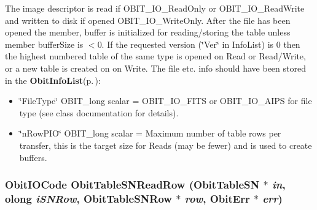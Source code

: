 The image descriptor is read if OBIT\_\-IO\_\-Read\-Only or OBIT\_\-IO\_\-Read\-Write and written to disk if opened OBIT\_\-IO\_\-Write\-Only. After the file has been opened the member, buffer is initialized for reading/storing the table unless member buffer\-Size is $<$0. If the requested version (\char`\"{}Ver\char`\"{} in Info\-List) is 0 then the highest numbered table of the same type is opened on Read or Read/Write, or a new table is created on on Write. The file etc. info should have been stored in the {\bf Obit\-Info\-List}{\rm (p.\,\pageref{structObitInfoList})}: \begin{itemize}
\item \char`\"{}File\-Type\char`\"{} OBIT\_\-long scalar = OBIT\_\-IO\_\-FITS or OBIT\_\-IO\_\-AIPS for file type (see class documentation for details). \item \char`\"{}n\-Row\-PIO\char`\"{} OBIT\_\-long scalar = Maximum number of table rows per transfer, this is the target size for Reads (may be fewer) and is used to create buffers. 
\end{itemize}
\subsubsection{\setlength{\rightskip}{0pt plus 5cm}Obit\-IOCode Obit\-Table\-SNRead\-Row ({\bf Obit\-Table\-SN} $\ast$ {\em in}, {\bf olong} {\em i\-SNRow}, {\bf Obit\-Table\-SNRow} $\ast$ {\em row}, {\bf Obit\-Err} $\ast$ {\em err})}\label{ObitTableSN_8h_a18}


